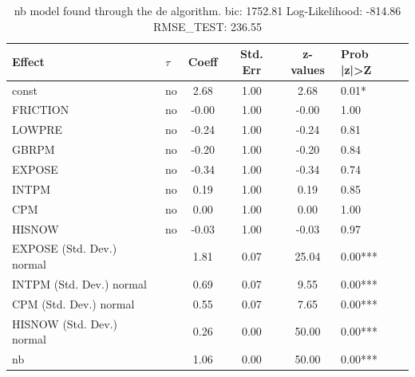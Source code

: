 \begin{table}
	\caption{nb model found through the de algorithm. bic: 1752.81 Log-Likelihood: -814.86 RMSE_TEST: 236.55}
	\begin{center}
		\begin{tabular}{|l|l|c|c|c|l|}
			\hline
			Effect & $\tau$ & Coeff & Std. Err & z-values & Prob |z|>Z \\
			\hline
			const & no & 2.68 & 1.00 & 2.68 & 0.01* \\
			\hline
			FRICTION & no & -0.00 & 1.00 & -0.00 & 1.00 \\
			\hline
			LOWPRE & no & -0.24 & 1.00 & -0.24 & 0.81 \\
			\hline
			GBRPM & no & -0.20 & 1.00 & -0.20 & 0.84 \\
			\hline
			EXPOSE & no & -0.34 & 1.00 & -0.34 & 0.74 \\
			\hline
			INTPM & no & 0.19 & 1.00 & 0.19 & 0.85 \\
			\hline
			CPM & no & 0.00 & 1.00 & 0.00 & 1.00 \\
			\hline
			HISNOW & no & -0.03 & 1.00 & -0.03 & 0.97 \\
			\hline
			EXPOSE (Std. Dev.) normal &  & 1.81 & 0.07 & 25.04 & 0.00*** \\
			\hline
			INTPM (Std. Dev.) normal &  & 0.69 & 0.07 & 9.55 & 0.00*** \\
			\hline
			CPM (Std. Dev.) normal &  & 0.55 & 0.07 & 7.65 & 0.00*** \\
			\hline
			HISNOW (Std. Dev.) normal &  & 0.26 & 0.00 & 50.00 & 0.00*** \\
			\hline
			nb &  & 1.06 & 0.00 & 50.00 & 0.00*** \\
			\hline
		\end{tabular}
	\end{center}
\end{table}